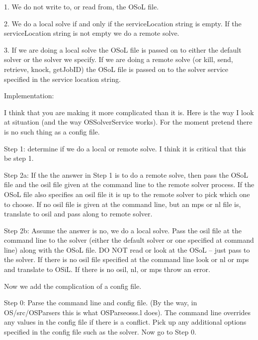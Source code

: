 \label{section:OSSolverServiceRules}


1. We do not write to, or read from, the OSoL file.

2. We do a local solve if and only if the serviceLocation string is empty. If the serviceLocation string is not empty we do a remote solve.

3. If we are doing a local solve the OSoL file is passed on to either the default solver or the solver we specify.  If we are doing a remote solve (or kill, send, retrieve, knock, getJobID)  the OSoL file is passed on to the solver service specified in the service location string. 


Implementation:

I think that you are making it more complicated than it is. Here is the way I look at situation (and the way OSSolverService works).  For the moment pretend there is no such thing as a config file.


Step 1: determine if we do a local or remote solve.  I think it is critical that this be step 1.

Step 2a: If the the answer in Step 1 is to do a remote solve, then pass the OSoL file and the osil file given at the command line to the remote solver process. If the OSoL file also specifies an osil file it is up to the remote solver to pick which one to choose. If no osil file is given at the command line, but an mps or nl file is, translate to osil and pass along to remote solver.

Step 2b: Assume the answer is no, we do a local solve. Pass the osil file at the command line to the solver (either the default solver or one specified at command line) along with the OSoL file. DO NOT read or look at the OSoL -- just pass to the solver. If there is no osil file specified at the command line look or nl or mps and translate to OSiL. If there is no osil, nl, or mps throw an error.


Now we add the complication of a config file.

Step 0: Parse the command line and config file. (By the way, in OS/src/OSParsers this is what  OSParseosss.l does). The command line overrides any values in the config file if there is a conflict. Pick up any additional options specified in the config file such as the solver. Now go to Step 0.
